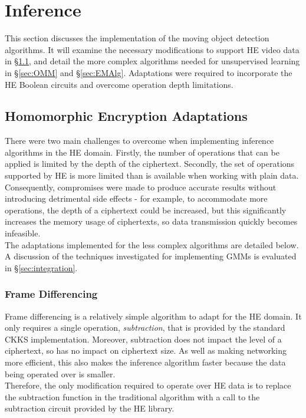 \setlength{\leftskip}{0cm}




\section{Inference}
\label{sec:inference}
\setlength{\leftskip}{0.25cm}
\indent \indent
This section discusses the implementation of the moving object detection algorithms. It will examine the necessary modifications to support HE video data in §\ref{sec:adaptations}, and detail the more complex algorithms needed for unsupervised learning in §\ref{sec:OMM} and §\ref{sec:EMAlg}. Adaptations were required to incorporate the HE Boolean circuits and overcome operation depth limitations. 

\setlength{\leftskip}{0cm}
\subsection{Homomorphic Encryption Adaptations}
\label{sec:adaptations}
\setlength{\leftskip}{0.5cm}
\indent \indent
There were two main challenges to overcome when implementing inference algorithms in the HE domain. Firstly, the number of operations that can be applied is limited by the depth of the ciphertext. Secondly, the set of operations supported by HE is more limited than is available when working with plain data. Consequently, compromises were made to produce accurate results without introducing detrimental side effects - for example, to accommodate more operations, the depth of a ciphertext could be increased, but this significantly increases the memory usage of ciphertexts, so data transmission quickly becomes infeasible.
\smallskip \\ \indent
The adaptations implemented for the less complex algorithms are detailed below. A discussion of the techniques investigated for implementing GMMs is evaluated in §\ref{sec:integration}.

\setlength{\leftskip}{0cm}
\subsubsection{Frame Differencing}
\setlength{\leftskip}{0.5cm}
\indent \indent
Frame differencing is a relatively simple algorithm to adapt for the HE domain. It only requires a single operation, \textit{subtraction}, that is provided by the standard CKKS implementation. Moreover, subtraction does not impact the level of a ciphertext, so has no impact on ciphertext size. As well as making networking more efficient, this also makes the inference algorithm faster because the data being operated over is smaller.
\smallskip \\ \indent
Therefore, the only modification required to operate over HE data is to replace the subtraction function in the traditional algorithm with a call to the subtraction circuit provided by the HE library.


